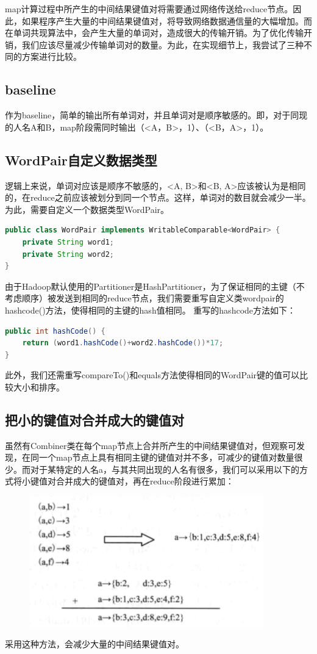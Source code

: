 map计算过程中所产生的中间结果键值对将需要通过网络传送给reduce节点。因此，如果程序产生大量的中间结果键值对，将导致网络数据通信量的大幅增加。而在单词共现算法中，会产生大量的单词对，造成很大的传输开销。为了优化传输开销，我们应该尽量减少传输单词对的数量。为此，在实现细节上，我尝试了三种不同的方案进行比较。
\subsection{baseline}
作为baseline，简单的输出所有单词对，并且单词对是顺序敏感的。即，对于同现的人名A和B，map阶段需同时输出（<A，B>，1）、（<B，A>，1）。
\subsection{WordPair自定义数据类型}
逻辑上来说，单词对应该是顺序不敏感的，<A, B>和<B, A>应该被认为是相同的，在reduce之前应该被划分到同一个节点。这样，单词对的数目就会减少一半。为此，需要自定义一个数据类型WordPair。
\begin{lstlisting}[language=Java]
public class WordPair implements WritableComparable<WordPair> {
	private String word1;
	private String word2;
}
\end{lstlisting}
\indent 由于Hadoop默认使用的Partitioner是HashPartitioner，为了保证相同的主键（不考虑顺序）被发送到相同的reduce节点，我们需要重写自定义类wordpair的hashcode()方法，使得相同的主键的hash值相同。
重写的hashcode方法如下：
\begin{lstlisting}[language=Java]
public int hashCode() {
	return (word1.hashCode()+word2.hashCode())*17;
}
\end{lstlisting}
此外，我们还需重写compareTo()和equals方法使得相同的WordPair键的值可以比较大小和排序。
\subsection{把小的键值对合并成大的键值对}
虽然有Combiner类在每个map节点上合并所产生的中间结果键值对，但观察可发现，在同一个map节点上具有相同主键的键值对并不多，可减少的键值对数量很少。而对于某特定的人名a，与其共同出现的人名有很多，我们可以采用以下的方式将小键值对合并成大的键值对，再在reduce阶段进行累加：
\begin{figure}[htbp]
	\begin{center}
		\includegraphics[width=4in]{figures/combine.png}
	\end{center}
\end{figure}
采用这种方法，会减少大量的中间结果键值对。
